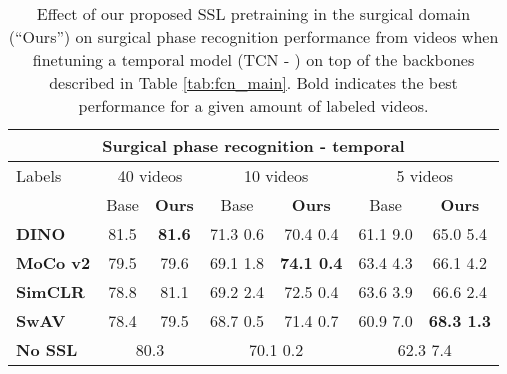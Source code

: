 \documentclass[times,twocolumn,final]{elsarticle}
\begin{document}
\begin{table*}[th!]
  \centering
  \caption{{\color{changetext} Effect of our proposed SSL pretraining in the surgical domain (``Ours'') on surgical phase recognition performance from videos when finetuning a temporal model (TCN - \cite{Czempiel2020TeCNOSP}) on top of the backbones described in Table \ref{tab:fcn_main}. Bold indicates the best performance for a given amount of labeled videos.}}
  \label{tab:tcn_main}
  \begin{tabular*}{\textwidth}{l @{\extracolsep{\fill}}cccccc}
  \hline
  \multicolumn{7}{c}{\textbf{Surgical phase recognition  - temporal}}                      \\ \hline
  Labels & \multicolumn{2}{c}{40 videos} & \multicolumn{2}{c}{10 videos} & \multicolumn{2}{c}{5 videos} \\ \hline
         & Base    & \textbf{Ours}   & Base   & \textbf{Ours}   & Base    & \textbf{Ours}    \\
  \textbf{DINO}   & 81.5 & \textbf{81.6}	&	71.3  0.6 & 70.4  0.4 &	61.1  9.0 & 65.0  5.4 \\
  \textbf{MoCo v2}   & 79.5 & 79.6	&	69.1  1.8 & \textbf{74.1  0.4}	&	63.4  4.3 & 66.1  4.2 \\
  \textbf{SimCLR} & 78.8 & 81.1	&	69.2  2.4 & 72.5  0.4	&	63.6  3.9 & 66.6  2.4 \\
  \textbf{SwAV} & 78.4 & 79.5	&	68.7  0.5 & 71.4  0.7	&	60.9  7.0 & \textbf{68.3  1.3} \\
   \hline
  \textbf{No SSL} & \multicolumn{2}{c}{80.3}      & \multicolumn{2}{c}{70.1  0.2}     & \multicolumn{2}{c}{62.3  7.4} \\ \hline
  \end{tabular*}
\end{table*}
\end{document}
